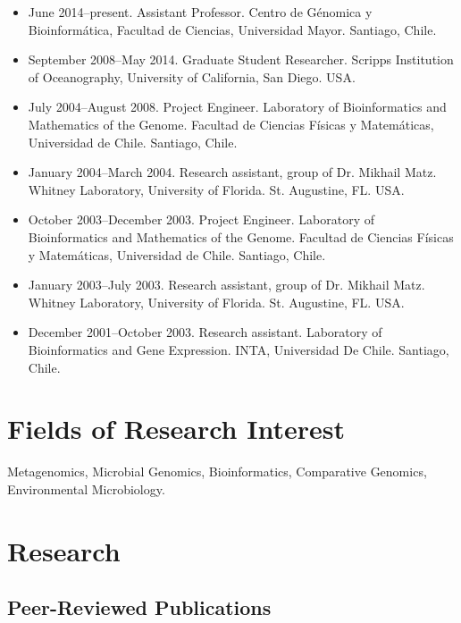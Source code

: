 \documentclass[10pt,letterpaper]{article}
\begin{document}
\begin{itemize}

\item June 2014--present. Assistant Professor. Centro de G\'enomica y Bioinform\'atica, Facultad de Ciencias, Universidad Mayor. Santiago, Chile.

\item September 2008--May 2014. Graduate Student Researcher. Scripps Institution of Oceanography, University of California, San Diego. USA.

\item July 2004--August 2008. Project Engineer. Laboratory of Bioinformatics and Mathematics of the Genome. Facultad de Ciencias F\'isicas y Matem\'aticas, Universidad de Chile. Santiago, Chile.

\item January 2004--March 2004. Research assistant, group of Dr. Mikhail Matz. Whitney Laboratory, University of Florida. St. Augustine, FL. USA.

\item October 2003--December 2003. Project Engineer. Laboratory of Bioinformatics and Mathematics of the Genome. Facultad de Ciencias F\'isicas y Matem\'aticas, Universidad de Chile. Santiago, Chile.

\item January 2003--July 2003. Research assistant, group of Dr. Mikhail Matz. Whitney Laboratory, University of Florida. St. Augustine, FL. USA.

\item December 2001--October 2003. Research assistant. Laboratory of Bioinformatics and Gene Expression. INTA, Universidad De Chile. Santiago, Chile.


\end{itemize}


\section*{Fields of Research Interest}

Metagenomics, Microbial Genomics, Bioinformatics, Comparative Genomics, Environmental Microbiology.

\section*{Research}

\subsection*{Peer-Reviewed Publications}
\end{document}
